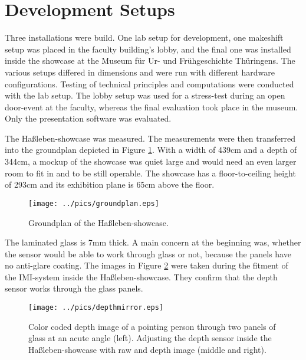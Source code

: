 
%


\section{Development Setups}
\label{setup_development}

Three installations were build. One lab setup for development, one makeshift setup was placed in the faculty building's lobby, and the final one was installed inside the showcase at the Museum für Ur- und Frühgeschichte Thüringens. The various setups differed in dimensions and were run with different hardware configurations. Testing of technical principles and computations were conducted with the lab setup. The lobby setup was used for a stress-test during an open door-event at the faculty, whereas the final evaluation took place in the museum. Only the presentation software was evaluated.

The Haßleben-showcase was measured. The measurements were then transferred into the groundplan depicted in Figure \ref{fig:hassleben_groundplan}. With a width of 439cm and a depth of 344cm, a mockup of the showcase was quiet large and would need an even larger room to fit in and to be still operable. The showcase has a floor-to-ceiling height of 293cm and its exhibition plane is 65cm above the floor.
\begin{figure}[H]%
\texttt{[image: ../pics/groundplan.eps]}%
\caption{Groundplan of the Haßleben-showcase.}%
\label{fig:hassleben_groundplan} %
\end{figure}

The laminated glass is 7mm thick. A main concern at the beginning was, whether the sensor would be able to work through glass or not, because the panels have no anti-glare coating. The images in Figure \ref{fig:hassleben_glass} were taken during the fitment of the \ac{IMI}-system inside the Haßleben-showcase. They confirm that the depth sensor works through the glass panels.
\begin{figure}[H]%
\texttt{[image: ../pics/depthmirror.eps]}%
\caption{Color coded depth image of a pointing person through two panels of glass at an acute angle (left). Adjusting the depth sensor inside the Haßleben-showcase with raw and depth image (middle and right).}%
\label{fig:hassleben_glass} %
\end{figure}

